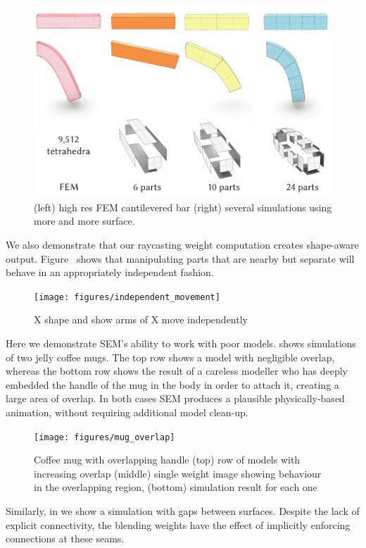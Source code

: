 \begin{figure}[h]
  \includegraphics[width=\columnwidth]{figures/beams.pdf}
  \caption{(left) high res FEM cantilevered bar (right) several simulations using more and more surface.}
  \label{fig:convergence}
\end{figure}

We also demonstrate that our raycasting weight computation creates shape-aware output. Figure~ shows that manipulating
parts that are nearby but separate will behave in an appropriately independent fashion. 
\begin{figure}[h]
  \texttt{[image: figures/independent\_movement]}
  \caption{X shape and show arms of X move independently}
  \label{fig:independence}
\end{figure}

Here we demonstrate SEM's ability to work with poor models.  shows simulations of two jelly coffee mugs. 
The top row shows a model with negligible overlap, whereas the bottom row shows the result of a careless modeller who has deeply embedded the handle of the mug in the body in order to attach it, creating a large area of overlap.
In both cases SEM produces a plausible physically-based animation, without requiring additional model clean-up.
\begin{figure}[h]
  \texttt{[image: figures/mug\_overlap]}
  \caption{Coffee mug with overlapping handle (top) row of models with increasing overlap (middle) single weight image showing behaviour in the overlapping region, (bottom) simulation result for each one}
  \label{fig:badmodels}
\end{figure}
Similarly, in  we show a simulation with gaps between surfaces. Despite the lack of explicit connectivity, the blending weights have the effect of implicitly enforcing connections at these seams. 

